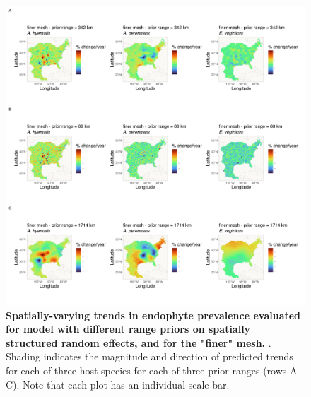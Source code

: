 \documentclass[11pt]{article}
\newcommand{\firstrevise}[1]{{\color{black}{#1}}}
\begin{document}
\begin{figure}[H]
	\centering
	\includegraphics[width = .8\linewidth]{../Plots/finer_mesh_comparison_svc_plot.png}
	\caption[Spatially-varying trends in endophyte prevalence evaluated for the endophyte prevalence model with different range priors on spatially structured random effects, and for the "finer" mesh]{\textbf{Spatially-varying trends in endophyte prevalence evaluated for \firstrevise{the endophyte prevalence} model with different range priors on spatially structured random effects, and for the "finer" mesh.} \firstrevise{Data used in model fitting is the same across all panels and as in the main text}. Shading indicates the magnitude and direction of predicted trends for each of three host species for each of three prior ranges (rows A-C). Note that each plot has an individual scale bar.}
	\label{fig:finer_comparison_svc_plot}
\end{figure}
\newpage
\end{document}
